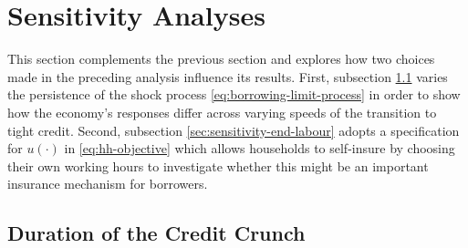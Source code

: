 \documentclass[a4paper,12pt]{article} %
\numberwithin{equation}{section} %
\numberwithin{figure}{section}
\numberwithin{table}{section}
\begin{document}


\section{Sensitivity Analyses}
\label{sec:sensitivity}

This section complements the previous section and explores how two choices made in the preceding analysis influence its
results. First, subsection \ref{sec:sensitivity-persistence} varies the persistence of the shock process \eqref{eq:borrowing-limit-process} in order to show how the economy's responses differ across varying speeds of the transition to tight credit. Second, subsection \ref{sec:sensitivity-end-labour} adopts a specification for $u( \cdot )$ in \eqref{eq:hh-objective} which allows households to self-insure by choosing their own working hours to investigate whether this might be an important insurance mechanism for borrowers.

\subsection{Duration of the Credit Crunch}
\label{sec:sensitivity-persistence}
\end{document}
